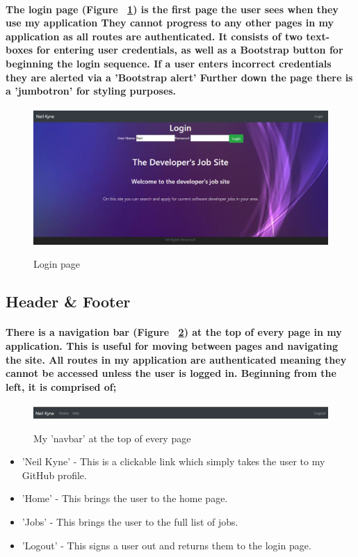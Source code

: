 \paragraph{The login page (Figure ~\ref{login_label}) is the first page the user sees when they use my application They cannot progress to any other pages in my application as all routes are authenticated. It consists of two text-boxes for entering user credentials, as well as a Bootstrap button for beginning the login sequence. If a user enters incorrect credentials they are alerted via a 'Bootstrap alert' Further down the page there is a 'jumbotron' for styling purposes.}
\begin{figure}[ht]
    \centering
    \includegraphics[scale=0.3]{Images/login.png} 
    \label{login_label}
    \caption{Login page}
\end{figure}

\subsection{Header \& Footer}
\paragraph{There is a navigation bar (Figure ~\ref{header_label}) at the top of every page in my application. This is useful for moving between pages and navigating the site. All routes in my application are authenticated meaning they cannot be accessed unless the user is logged in. Beginning from the left, it is comprised of;}
\begin{figure}[h]
    \centering
    \includegraphics[scale=0.35]{Images/header.png} 
    \label{header_label}
    \caption{My 'navbar' at the top of every page}
\end{figure}
\begin{itemize}
    \item 'Neil Kyne' - This is a clickable link which simply takes the user to my GitHub profile.
    \item 'Home' - This brings the user to the home page.
    \item 'Jobs' - This brings the user to the full list of jobs.
    \item 'Logout' - This signs a user out and returns them to the login page.
\end{itemize}
